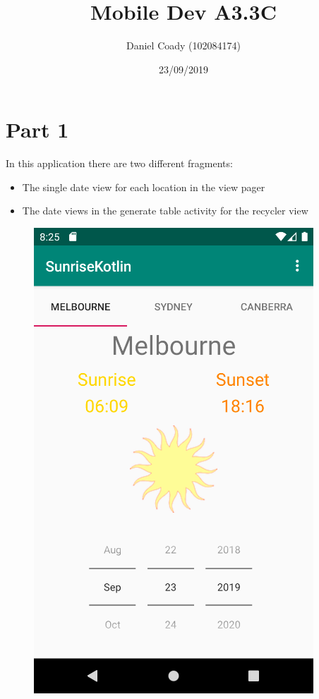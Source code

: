 \documentclass{scrartcl}
\title{Mobile Dev A3.3C}
\author{Daniel Coady (102084174)}
\date{23/09/2019}
\begin{document}
\maketitle

\section*{Part 1}
In this application there are two different fragments:
\begin{itemize}
    \item The single date view for each location in the view pager
    \item The date views in the generate table activity for the recycler view
\end{itemize}

\begin{figure}[h]
    \centering
    \includegraphics[scale=0.5]{images/screen1.png}

\end{figure}
\end{document}
